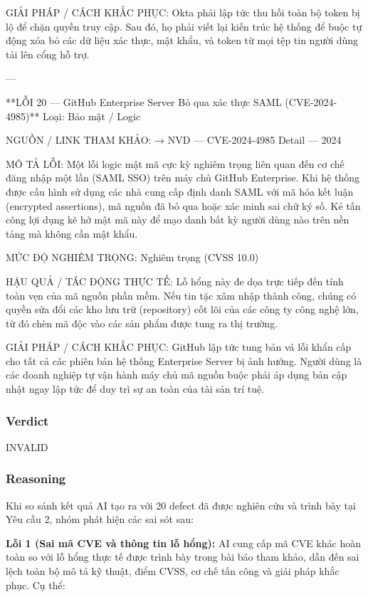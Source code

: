 GIẢI PHÁP / CÁCH KHẮC PHỤC:
Okta phải lập tức thu hồi toàn bộ token bị lộ để chặn quyền truy cập. Sau đó, họ phải viết lại kiến trúc hệ thống để buộc tự động xóa bỏ các dữ liệu xác thực, mật khẩu, và token từ mọi tệp tin người dùng tải lên cổng hỗ trợ.

---

**LỖI 20 — GitHub Enterprise Server Bỏ qua xác thực SAML (CVE-2024-4985)**
Loại: Bảo mật / Logic

NGUỒN / LINK THAM KHẢO:
→ NVD — CVE-2024-4985 Detail — 2024

MÔ TẢ LỖI:
Một lỗi logic mật mã cực kỳ nghiêm trọng liên quan đến cơ chế đăng nhập một lần (SAML SSO) trên máy chủ GitHub Enterprise. Khi hệ thống được cấu hình sử dụng các nhà cung cấp định danh SAML với mã hóa kết luận (encrypted assertions), mã nguồn đã bỏ qua hoặc xác minh sai chữ ký số. Kẻ tấn công lợi dụng kẽ hở mật mã này để mạo danh bất kỳ người dùng nào trên nền tảng mà không cần mật khẩu.

MỨC ĐỘ NGHIÊM TRỌNG:
Nghiêm trọng (CVSS 10.0)

HẬU QUẢ / TÁC ĐỘNG THỰC TẾ:
Lỗ hổng này đe dọa trực tiếp đến tính toàn vẹn của mã nguồn phần mềm. Nếu tin tặc xâm nhập thành công, chúng có quyền sửa đổi các kho lưu trữ (repository) cốt lõi của các công ty công nghệ lớn, từ đó chèn mã độc vào các sản phẩm được tung ra thị trường.

GIẢI PHÁP / CÁCH KHẮC PHỤC:
GitHub lập tức tung bản vá lỗi khẩn cấp cho tất cả các phiên bản hệ thống Enterprise Server bị ảnh hưởng. Người dùng là các doanh nghiệp tự vận hành máy chủ mã nguồn buộc phải áp dụng bản cập nhật ngay lập tức để duy trì sự an toàn của tài sản trí tuệ.

\subsubsection{Verdict}
INVALID

\subsubsection{Reasoning}

Khi so sánh kết quả AI tạo ra với 20 defect đã được nghiên cứu và trình bày tại Yêu cầu 2, nhóm phát hiện các sai sót sau:

\vspace{0.2cm}

\textbf{Lỗi 1 (Sai mã CVE và thông tin lỗ hổng):} AI cung cấp mã CVE khác hoàn toàn so với lỗ hổng thực tế được trình bày trong bài báo tham khảo, dẫn đến sai lệch toàn bộ mô tả kỹ thuật, điểm CVSS, cơ chế tấn công và giải pháp khắc phục. Cụ thể:

